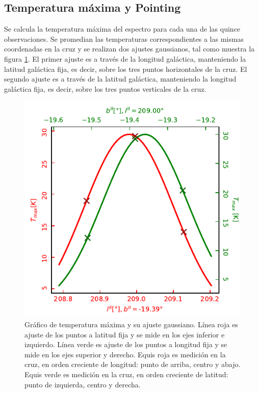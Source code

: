 \subsection{Temperatura máxima y Pointing}

Se calcula la temperatura máxima del espectro para cada una de las quince observaciones. Se promedian las temperaturas correspondientes a las mismas coordenadas en la cruz y se realizan dos ajustes gaussianos, tal como muestra la figura \ref{fig:tmax}. El primer ajuste es a través de la longitud galáctica, manteniendo la latitud galáctica fija, es decir, sobre los tres puntos horizontales de la cruz. El segundo ajuste es a través de la latitud galáctica, manteniendo la longitud galáctica fija, es decir, sobre los tres puntos verticales de la cruz.

\begin{figure}[p]
	\centering
	\includegraphics{tmax.pdf}
	\caption{Gráfico de temperatura máxima y su ajuste gaussiano. Línea roja es ajuste de los puntos a latitud fija y se mide en los ejes inferior e izquierdo. Línea verde es ajuste de los puntos a longitud fija y se mide en los ejes superior y derecho. Equis roja es medición en la cruz, en orden creciente de longitud: punto de arriba, centro y abajo. Equis verde es medición en la cruz, en orden creciente de latitud: punto de izquierda, centro y derecha.}
	\label{fig:tmax}
\end{figure}

